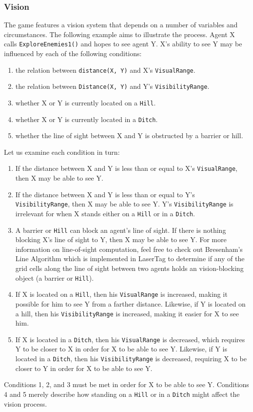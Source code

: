 \documentclass[a4paper,english,DIV=16,11pt,parskip=half,dvipsnames,listof=totoc,index=totoc,bibliography=totoc]{scrartcl}
\begin{document}
\subsubsection{Vision} \label{sssec:vision}
The game features a vision system that depends on a number of variables and circumstances. The following example aims to illustrate the process. Agent X calls \texttt{ExploreEnemies1()} and hopes to see agent Y. X's ability to see Y may be influenced by each of the following conditions:
%
\begin{enumerate}
  \item the relation between \texttt{distance(X, Y)} and X's \texttt{VisualRange}.
  \item the relation between \texttt{Distance(X, Y)} and Y's \texttt{VisibilityRange}.
  \item whether X or Y is currently located on a \texttt{Hill}.
  \item whether X or Y is currently located in a \texttt{Ditch}.
  \item whether the line of sight between X and Y is obstructed by a barrier or hill.
\end{enumerate}
%
Let us examine each condition in turn:
%
\begin{enumerate}
  \item If the distance between X and Y is less than or equal to X's \texttt{VisualRange}, then X may be able to see Y.
  \item If the distance between X and Y is less than or equal to Y's \texttt{VisibilityRange}, then X may be able to see Y. Y's \texttt{VisibilityRange} is irrelevant for when X stands either on a \texttt{Hill} or in a \texttt{Ditch}.
  \item A barrier or \texttt{Hill} can block an agent's line of sight. If there is nothing blocking X's line of sight to Y, then X may be able to see Y. For more information on line-of-sight computation, feel free to check out Bresenham's Line Algorithm which is implemented in LaserTag to determine if any of the grid cells along the line of sight between two agents holds an vision-blocking object (a barrier or \texttt{Hill}).
  \item If X is located on a \texttt{Hill}, then his \texttt{VisualRange} is increased, making it possible for him to see Y from a farther distance. Likewise, if Y is located on a hill, then his \texttt{VisibilityRange} is increased, making it easier for X to see him.
  \item If X is located in a \texttt{Ditch}, then his \texttt{VisualRange} is decreased, which requires Y to be closer to X in order for X to be able to see Y. Likewise, if Y is located in a \texttt{Ditch}, then his \texttt{VisibilityRange} is decreased, requiring X to be closer to Y in order for X to be able to see Y.
\end{enumerate}
%
Conditions 1, 2, and 3 must be met in order for X to be able to see Y. Conditions 4 and 5 merely describe how standing on a \texttt{Hill} or in a \texttt{Ditch} might affect the vision process.
%
\end{document}
